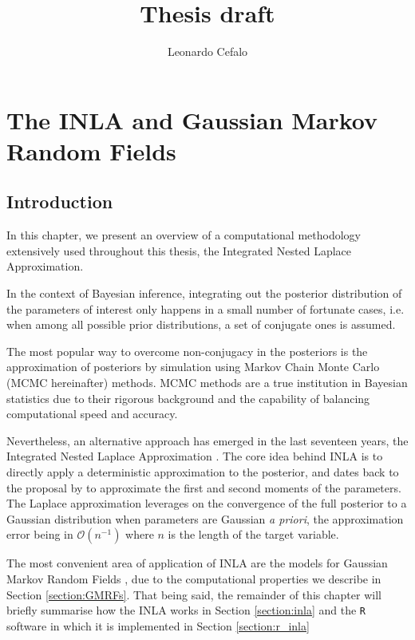 \documentclass[openany]{book}
\title{Thesis draft}
\author{Leonardo Cefalo}
\begin{document}
\maketitle
\tableofcontents
%
% 
%
\chapter[INLA]{The INLA and Gaussian Markov Random Fields} \label{chapter:INLA}
%
\section{Introduction}
In this chapter, we present an overview of a computational methodology extensively used throughout this thesis, the Integrated Nested Laplace Approximation. 

In the context of Bayesian inference, integrating out the posterior distribution of the parameters of interest only happens in a small number of fortunate cases, i.e. when among all possible prior distributions, a set of conjugate ones is assumed. 

The most popular way to overcome non-conjugacy in the posteriors is the approximation of posteriors by simulation using Markov Chain Monte Carlo (MCMC hereinafter) methods. MCMC methods are a true institution in Bayesian statistics due to their rigorous background and the capability of balancing computational speed and accuracy.

Nevertheless, an alternative approach has emerged in the last seventeen years, the Integrated Nested Laplace Approximation \citep[][INLA hereinafter]{INLA, VBINLA}. The core idea behind INLA is to directly apply a deterministic approximation to the posterior, and dates back to the proposal by \cite{tierney1986accurate} to approximate the first and second moments of the parameters. The Laplace approximation leverages on the convergence of the full posterior to a Gaussian distribution when parameters are Gaussian \textit{a priori}, the approximation error being in $\mathcal{O}(n^{-1})$ where $n$ is the length of the target variable. 

The most convenient area of application of INLA are the models for Gaussian Markov Random Fields \citep{GMRFs}, due to the computational properties we describe in Section \ref{section:GMRFs}. That being said, the remainder of this chapter will briefly summarise how the INLA works in Section \ref{section:inla} and the \texttt{R} software in which it is implemented in Section \ref{section:r_inla}
\end{document}
